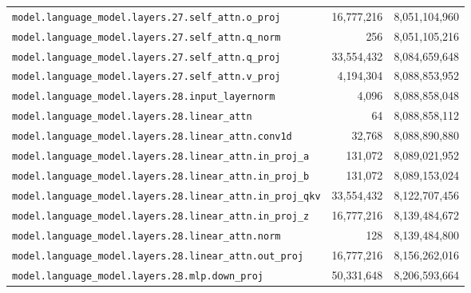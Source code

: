 \documentclass[10pt,a4paper]{article}
\theoremstyle{definition}
\begin{document}
\begin{appendices}
\begin{longtable}{p{9.5cm}rr}
\texttt{model.\allowbreak{}language\_model.\allowbreak{}layers.\allowbreak{}27.\allowbreak{}self\_attn.\allowbreak{}o\_proj} & 16,777,216 & 8,051,104,960 \\
\texttt{model.\allowbreak{}language\_model.\allowbreak{}layers.\allowbreak{}27.\allowbreak{}self\_attn.\allowbreak{}q\_norm} & 256 & 8,051,105,216 \\
\texttt{model.\allowbreak{}language\_model.\allowbreak{}layers.\allowbreak{}27.\allowbreak{}self\_attn.\allowbreak{}q\_proj} & 33,554,432 & 8,084,659,648 \\
\texttt{model.\allowbreak{}language\_model.\allowbreak{}layers.\allowbreak{}27.\allowbreak{}self\_attn.\allowbreak{}v\_proj} & 4,194,304 & 8,088,853,952 \\
\texttt{model.\allowbreak{}language\_model.\allowbreak{}layers.\allowbreak{}28.\allowbreak{}input\_layernorm} & 4,096 & 8,088,858,048 \\
\texttt{model.\allowbreak{}language\_model.\allowbreak{}layers.\allowbreak{}28.\allowbreak{}linear\_attn} & 64 & 8,088,858,112 \\
\texttt{model.\allowbreak{}language\_model.\allowbreak{}layers.\allowbreak{}28.\allowbreak{}linear\_attn.\allowbreak{}conv1d} & 32,768 & 8,088,890,880 \\
\texttt{model.\allowbreak{}language\_model.\allowbreak{}layers.\allowbreak{}28.\allowbreak{}linear\_attn.\allowbreak{}in\_proj\_a} & 131,072 & 8,089,021,952 \\
\texttt{model.\allowbreak{}language\_model.\allowbreak{}layers.\allowbreak{}28.\allowbreak{}linear\_attn.\allowbreak{}in\_proj\_b} & 131,072 & 8,089,153,024 \\
\texttt{model.\allowbreak{}language\_model.\allowbreak{}layers.\allowbreak{}28.\allowbreak{}linear\_attn.\allowbreak{}in\_proj\_qkv} & 33,554,432 & 8,122,707,456 \\
\texttt{model.\allowbreak{}language\_model.\allowbreak{}layers.\allowbreak{}28.\allowbreak{}linear\_attn.\allowbreak{}in\_proj\_z} & 16,777,216 & 8,139,484,672 \\
\texttt{model.\allowbreak{}language\_model.\allowbreak{}layers.\allowbreak{}28.\allowbreak{}linear\_attn.\allowbreak{}norm} & 128 & 8,139,484,800 \\
\texttt{model.\allowbreak{}language\_model.\allowbreak{}layers.\allowbreak{}28.\allowbreak{}linear\_attn.\allowbreak{}out\_proj} & 16,777,216 & 8,156,262,016 \\
\texttt{model.\allowbreak{}language\_model.\allowbreak{}layers.\allowbreak{}28.\allowbreak{}mlp.\allowbreak{}down\_proj} & 50,331,648 & 8,206,593,664 \\

\end{longtable}
\end{appendices}
\end{document}
